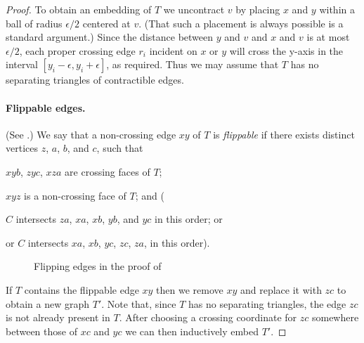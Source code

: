 \documentclass{patmorin}
\begin{document}
\begin{proof}
   To obtain an embedding of $T$ we uncontract $v$ by placing $x$ and $y$
   within a ball of radius $\epsilon/2$ centered at $v$. (That such
   a placement is always possible is a standard argument.)  Since the
   distance between $y$ and $v$ and $x$ and $v$ is at most $\epsilon/2$,
   each proper crossing edge $r_i$ incident on $x$ or $y$ will cross
   the y-axis in the interval $[y_i-\epsilon,y_i+\epsilon]$, as required.
   Thus we may assume that $T$ has no separating triangles of contractible
   edges.


   \paragraph{Flippable edges.}
   (See .)
   We say that a non-crossing edge $xy$ of $T$ is \emph{flippable} if there
   exists distinct vertices $z$, $a$, $b$, and $c$, such that 
   \begin{compactenum}
      \item $xyb$, $zyc$, $xza$ are crossing faces of $T$;
      \item $xyz$ is a non-crossing face of $T$; and (
      \item $C$ intersects $za$, $xa$, $xb$, $yb$, and $yc$ in this order; or 
      \item or $C$ intersects $xa$, $xb$, $yc$, $zc$, $za$, in this order).  
   \end{compactenum}
   \begin{figure}
      \caption{Flipping edges in the proof of
      }
   \end{figure}

   If $T$ contains the flippable edge $xy$ then we remove $xy$ and replace
   it with $zc$ to obtain a new graph $T'$.  Note that, since $T$ has
   no separating triangles, the edge $zc$ is not already present in $T$.
   After choosing a crossing coordinate for $zc$ somewhere between those
   of $xc$ and $yc$ we can then inductively embed $T'$.


\end{proof}
\end{document}

